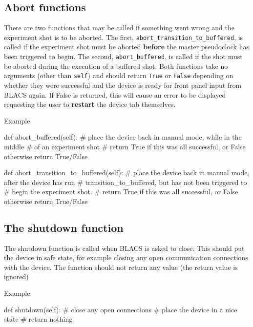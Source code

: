 \documentclass[12pt]{article}
\begin{document}
\subsection{Abort functions}
There are two functions that may be called if something went wrong and the experiment shot is to be aborted.
The first, \texttt{abort\_transition\_to\_buffered}, is called if the experiment shot must be aborted \textbf{before} the master pseudoclock has been triggered to begin.
The second, \texttt{abort\_buffered}, is called if the shot must be aborted during the execution of a buffered shot.
Both functions take no arguments (other than \texttt{self}) and should return \texttt{True} or \texttt{False} depending on whether they were successful and the device is ready for front panel input from BLACS again.
If False is returned, this will cause an error to be displayed requesting the user to \textbf{restart} the device tab themselves. 

Example
\begin{python}
    def abort_buffered(self):
        # place the device back in manual mode, while in the middle
        #       of an experiment shot
        # return True if this was all successful, or False otherwise
        return True/False
		
    def abort_transition_to_buffered(self):
        # place the device back in manual mode, after the device has run
        #       transition_to_buffered, but has not been triggered to 
        #       begin the experiment shot.
        # return True if this was all successful, or False otherwise
        return True/False		
\end{python}


\subsection{The shutdown function}
The shutdown function is called when BLACS is asked to close.
This should put the device in safe state, for example closing any open communication connections with the device.
The function should not return any value (the return value is ignored)

Example:
\begin{python}
    def shutdown(self):
        # close any open connections
        # place the device in a nice state
        # return nothing
\end{python}
\end{document}
